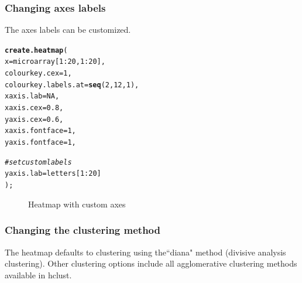 \documentclass[letterpaper]{report}\usepackage[]{graphicx}\usepackage[]{color}
\makeatletter
\newcommand{\hlnum}[1]{\textcolor[rgb]{0.686,0.059,0.569}{#1}}%
\newcommand{\hlcom}[1]{\textcolor[rgb]{0.678,0.584,0.686}{\textit{#1}}}%
\newcommand{\hlopt}[1]{\textcolor[rgb]{0,0,0}{#1}}%
\newcommand{\hlstd}[1]{\textcolor[rgb]{0.345,0.345,0.345}{#1}}%
\newcommand{\hlkwc}[1]{\textcolor[rgb]{0.333,0.667,0.333}{#1}}%
\newcommand{\hlkwd}[1]{\textcolor[rgb]{0.737,0.353,0.396}{\textbf{#1}}}%
\newenvironment{kframe}{%
 \def\at@end@of@kframe{}%
 \ifinner\ifhmode%
  \def\at@end@of@kframe{\end{minipage}}%
  \begin{minipage}{\columnwidth}%
 \fi\fi%
 \def\FrameCommand##1{\hskip\@totalleftmargin \hskip-\fboxsep
 \colorbox{shadecolor}{##1}\hskip-\fboxsep
     \hskip-\linewidth \hskip-\@totalleftmargin \hskip\columnwidth}%
 \MakeFramed {\advance\hsize-\width
   \@totalleftmargin\z@ \linewidth\hsize
   \@setminipage}}%
 {\par\unskip\endMakeFramed%
 \at@end@of@kframe}
\newenvironment{knitrout}{}{} %
\makeatother
\begin{document}
\subsubsection{Changing axes labels}
The axes labels can be customized.
\begin{knitrout}
\color{fgcolor}\begin{kframe}
\begin{alltt}
\hlkwd{create.heatmap}\hlstd{(}
    \hlkwc{x} \hlstd{= microarray[}\hlnum{1}\hlopt{:}\hlnum{20}\hlstd{,} \hlnum{1}\hlopt{:}\hlnum{20}\hlstd{],}
    \hlkwc{colourkey.cex} \hlstd{=} \hlnum{1}\hlstd{,}
    \hlkwc{colourkey.labels.at} \hlstd{=} \hlkwd{seq}\hlstd{(}\hlnum{2}\hlstd{,} \hlnum{12}\hlstd{,} \hlnum{1}\hlstd{),}
    \hlkwc{xaxis.lab} \hlstd{=} \hlnum{NA}\hlstd{,}
    \hlkwc{xaxis.cex} \hlstd{=} \hlnum{0.8}\hlstd{,}
    \hlkwc{yaxis.cex} \hlstd{=} \hlnum{0.6}\hlstd{,}
    \hlkwc{xaxis.fontface} \hlstd{=} \hlnum{1}\hlstd{,}
    \hlkwc{yaxis.fontface} \hlstd{=} \hlnum{1}\hlstd{,}

    \hlcom{# set custom labels}
    \hlkwc{yaxis.lab} \hlstd{= letters[}\hlnum{1}\hlopt{:}\hlnum{20}\hlstd{]}
    \hlstd{);}
\end{alltt}
\end{kframe}\begin{figure}

{\centering {} 

}

\caption[Heatmap with custom axes]{Heatmap with custom axes\label{fig:heatmap3}}
\end{figure}


\end{knitrout}

\subsubsection{Changing the clustering method}
The heatmap defaults to clustering using the``diana" method (divisive analysis clustering). Other clustering options include all agglomerative clustering methods available in hclust.
\end{document}
